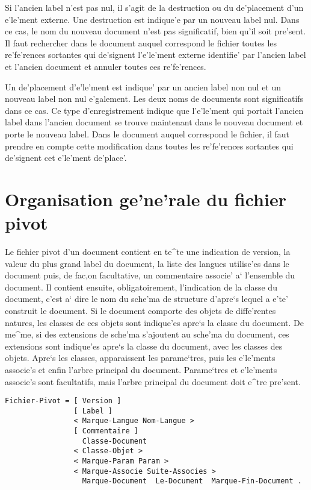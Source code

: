 Si l'ancien label n'est pas nul, il s'agit de la destruction ou du
de'placement d'un e'le'ment externe. Une destruction est indique'e par un
nouveau label nul. Dans ce cas, le nom du nouveau document n'est pas
significatif, bien qu'il soit pre'sent. Il faut rechercher dans le document
auquel correspond le fichier toutes les re'fe'rences sortantes qui de'signent
l'e'le'ment externe identifie' par l'ancien label et l'ancien document et
annuler toutes ces re'fe'rences.

Un de'placement d'e'le'ment est indique' par un ancien label non nul et
un nouveau label non nul e'galement. Les deux noms de documents sont
significatifs dans ce cas. Ce type d'enregistrement indique que l'e'le'ment
qui portait l'ancien label dans l'ancien document se trouve maintenant dans le
nouveau document et porte le nouveau label. Dans le document auquel
correspond le fichier, il faut prendre en compte cette modification dans
toutes les re'fe'rences sortantes qui de'signent cet e'le'ment de'place'.

\section{Organisation ge'ne'rale du fichier pivot}

Le fichier pivot d'un document contient en te^te une indication de version,
la valeur du plus grand label du document, la liste des langues utilise'es
dans le document puis, de fac,on
facultative, un commentaire associe' a` l'ensemble du document.
Il contient ensuite, obligatoirement, l'indication de la classe du document,
c'est a` dire le nom du sche'ma de structure d'apre`s lequel a e'te'
construit le document. Si le document comporte des objets de diffe'rentes
natures, les classes de ces objets sont indique'es apre`s la classe du
document. De me^me, si des extensions de sche'ma s'ajoutent au sche'ma du
document, ces extensions sont indique'es apre`s la classe du document, avec
les classes des objets.
Apre`s les classes, apparaissent les parame`tres, puis les e'le'ments
associe's et enfin l'arbre principal du document. Parame`tres et e'le'ments
associe's sont facultatifs, mais l'arbre principal du document doit e^tre
pre'sent.

\begin{verbatim}
Fichier-Pivot = [ Version ]
                [ Label ]
                < Marque-Langue Nom-Langue >
                [ Commentaire ]
                  Classe-Document
                < Classe-Objet >
                < Marque-Param Param >
                < Marque-Associe Suite-Associes >
                  Marque-Document  Le-Document  Marque-Fin-Document .
\end{verbatim}

